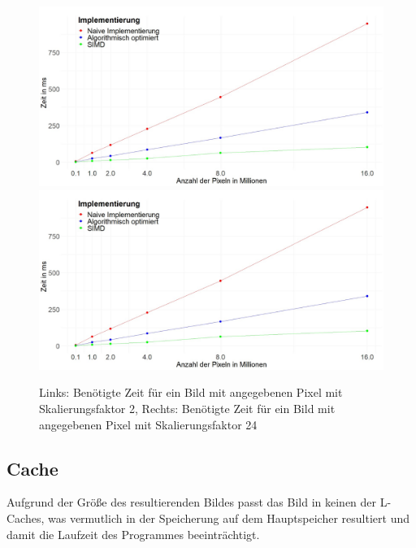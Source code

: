 \documentclass[course=erap]{aspdoc}
\begin{document}
\begin{figure}[h]
    \centering
    \includegraphics[scale=0.125]{Ausarbeitung/assets/speed.png}
    \includegraphics[scale=0.125]{Ausarbeitung/assets/speed.png}
    \caption{Links: Benötigte Zeit für ein Bild mit angegebenen Pixel mit Skalierungsfaktor 2, Rechts: Benötigte Zeit für ein Bild mit angegebenen Pixel mit Skalierungsfaktor 24}
    \label{fig:speed}
\end{figure}

\subsection{Cache}
Aufgrund der Größe des resultierenden Bildes passt das Bild in keinen der L-Caches, was vermutlich in der Speicherung auf dem Hauptspeicher resultiert und damit die Laufzeit des Programmes beeinträchtigt.
\end{document}
